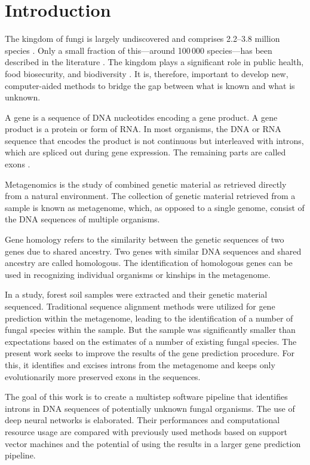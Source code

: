\chapter{\label{ch:intro}Introduction}

\minitoc

The kingdom of fungi is largely undiscovered and comprises 2.2--3.8 million
species \cite{hawksworth2017fungal}. Only a small fraction of this---around
100\,000 species---has been described in the literature
\cite{hawksworth2012global}. The kingdom plays a significant role in public
health, food biosecurity, and biodiversity \cite{microbiology2017stop}. It is,
therefore, important to develop new, computer-aided methods to bridge the gap
between what is known and what is unknown.

A gene is a sequence of DNA nucleotides encoding a gene product. A gene product
is a protein or form of RNA. In most organisms, the DNA or RNA sequence that
encodes the product is not continuous but interleaved with introns, which are
spliced out during gene expression. The remaining parts are called exons
\cite{alberts2018molecular}.

Metagenomics is the study of combined genetic material as retrieved directly
from a natural environment. The collection of genetic material retrieved from a
sample is known as metagenome, which, as opposed to a single genome, consist of
the DNA sequences of multiple organisms.

Gene homology refers to the similarity between the genetic sequences of two
genes due to shared ancestry. Two genes with similar DNA sequences and shared
ancestry are called homologous. The identification of homologous genes can be
used in recognizing individual organisms or kinships in the metagenome.

In a study, forest soil samples were extracted and their genetic material
sequenced. Traditional sequence alignment methods were utilized for gene
prediction within the metagenome, leading to the identification of a number of
fungal species within the sample. But the sample was significantly smaller than
expectations based on the estimates of a number of existing fungal species. The
present work seeks to improve the results of the gene prediction procedure. For
this, it identifies and excises introns from the metagenome and keeps only
evolutionarily more preserved exons in the sequences.

The goal of this work is to create a multistep software pipeline that
identifies introns in DNA sequences of potentially unknown fungal organisms.
The use of deep neural networks is elaborated. Their performances and
computational resource usage are compared with previously used methods based on
support vector machines and the potential of using the results in a larger gene
prediction pipeline.


